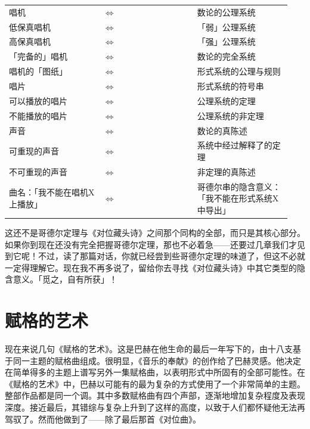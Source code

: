 \documentclass[
  12pt,
  twoside,
  openright,
  oldfontcommands,
]{memoir}
\begin{document}
\begin{longtable}[]{>{\raggedright\arraybackslash}p{0.313\linewidth} >{\raggedright\arraybackslash}p{0.313\linewidth} >{\raggedright\arraybackslash}p{0.313\linewidth}}
\toprule\noalign{}
\endhead
\bottomrule\noalign{}
\endlastfoot
唱机 & $\Leftrightarrow$ & 数论的公理系统 \\
低保真唱机 & $\Leftrightarrow$ & 「弱」公理系统 \\
高保真唱机 & $\Leftrightarrow$ & 「强」公理系统 \\
「完备的」唱机 & $\Leftrightarrow$ & 数论的完全系统 \\
唱机的「图纸」 & $\Leftrightarrow$ & 形式系统的公理与规则 \\
唱片 & $\Leftrightarrow$ & 形式系统的符号串 \\
可以播放的唱片 & $\Leftrightarrow$ & 公理系统的定理 \\
不能播放的唱片 & $\Leftrightarrow$ & 公理系统的非定理 \\
声音 & $\Leftrightarrow$ & 数论的真陈述 \\
可重现的声音 & $\Leftrightarrow$ & 系统中经过解释了的定理 \\
不可重现的声音 & $\Leftrightarrow$ & 非定理的真陈述 \\
曲名：「我不能在唱机X上播放」 & $\Leftrightarrow$ &
哥德尔串的隐含意义：「我不能在形式系统X中导出」 \\
\end{longtable}

这还不是哥德尔定理与《对位藏头诗》之间那个同构的全部，而只是其核心部分。如果你到现在还没有完全把握哥德尔定理，那也不必着急------还要过几章我们才见到它呢！不过，读了那篇对话，你就已经尝到些哥德尔定理的味道了，但这不必就一定得理解它。现在我不再多说了，留给你去寻找《对位藏头诗》中其它类型的隐含意义。「觅之，自有所获」！

\section{赋格的艺术}

现在来说几句《赋格的艺术》。这是巴赫在他生命的最后一年写下的，由十八支基于同一主题的赋格曲组成。很明显，《音乐的奉献》的创作给了巴赫灵感。他决定在简单得多的主题上谱写另外一集赋格曲，以表明形式中所固有的全部可能性。在《赋格的艺术》中，巴赫以可能有的最为复杂的方式使用了一个非常简单的主题。整部作品都是同一个调。其中多数赋格曲有四个声部，逐渐地增加复杂程度及表现深度。接近最后，其错综与复杂上升到了这样的高度，以致于人们都怀疑他无法再驾驭了。然而他做到了------除了最后那首《对位曲》。
\end{document}
